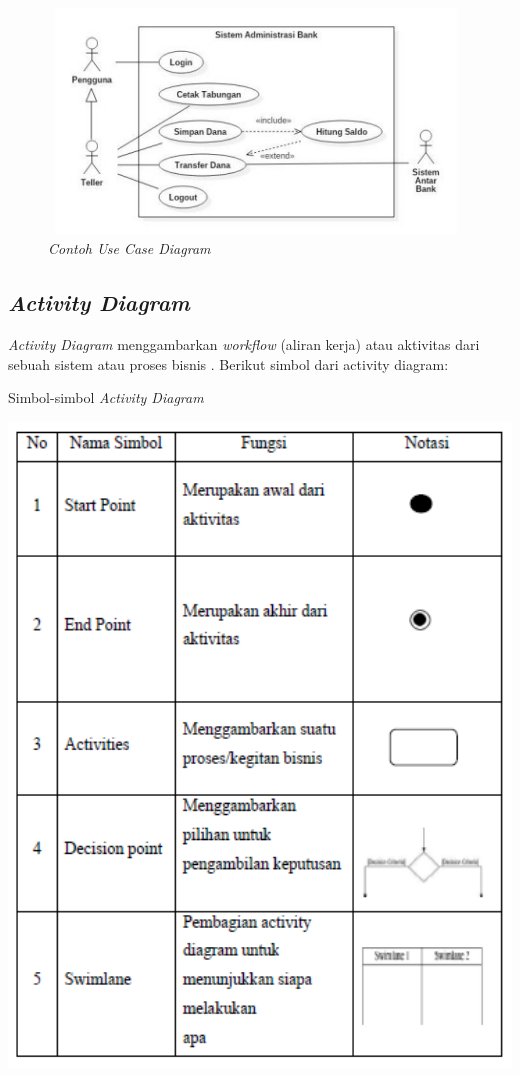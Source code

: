 \begin{figure}[H]
	\centering
	\includegraphics[width=11cm,height=6cm]{gambar/contohusecase}
	\caption{\textit{Contoh \textit{Use Case Diagram}}}
	\label{contoh_usecase}
\end{figure}

\subsection{\emph{Activity Diagram}} 

\emph{Activity Diagram} menggambarkan \textit{workflow} (aliran kerja) atau aktivitas dari sebuah sistem atau proses bisnis \cite{AdeHendini}. Berikut simbol dari activity diagram:

\begin{table}[H]
	\centering
	\caption{Simbol-simbol \emph{Activity Diagram}}
	\includegraphics[width=1.0\textwidth]{gambar/simbolactivity}
	\label{tabel_karaktermax2}
\end{table}

